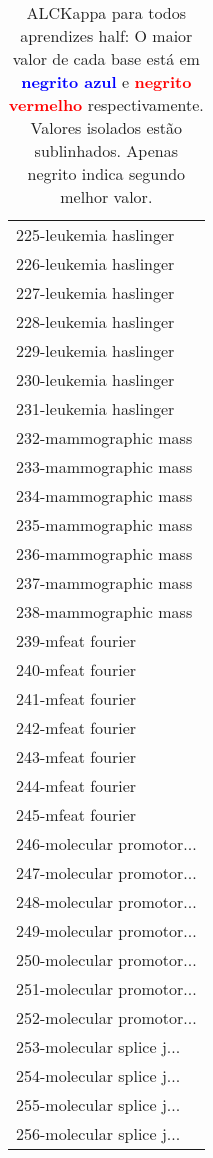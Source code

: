 \begin{table}[h]
\caption{ALCKappa para todos aprendizes half: O maior valor de cada base está em \textcolor{blue}{\textbf{negrito azul}} e \textcolor{red}{\textbf{negrito vermelho}} respectivamente. Valores isolados estão sublinhados. Apenas negrito indica segundo melhor valor.}
\begin{center}\begin{tabular}{l}
 & \\ \hline 225-leukemia haslinger &  \\
226-leukemia haslinger &  \\
227-leukemia haslinger &  \\
228-leukemia haslinger &  \\
229-leukemia haslinger &  \\
230-leukemia haslinger &  \\
231-leukemia haslinger &  \\ \hline
232-mammographic mass &  \\
233-mammographic mass &  \\
234-mammographic mass &  \\
235-mammographic mass &  \\
236-mammographic mass &  \\
237-mammographic mass &  \\
238-mammographic mass &  \\ \hline
239-mfeat fourier &  \\
240-mfeat fourier &  \\
241-mfeat fourier &  \\
242-mfeat fourier &  \\
243-mfeat fourier &  \\
244-mfeat fourier &  \\
245-mfeat fourier &  \\ \hline
246-molecular promotor... &  \\
247-molecular promotor... &  \\
248-molecular promotor... &  \\
249-molecular promotor... &  \\
250-molecular promotor... &  \\
251-molecular promotor... &  \\
252-molecular promotor... &  \\ \hline
253-molecular splice j... &  \\
254-molecular splice j... &  \\
255-molecular splice j... &  \\
256-molecular splice j... &  \\\end{tabular}\label{stratsALCKappa7AllReduxHalfb}
\end{center}
\end{table}
